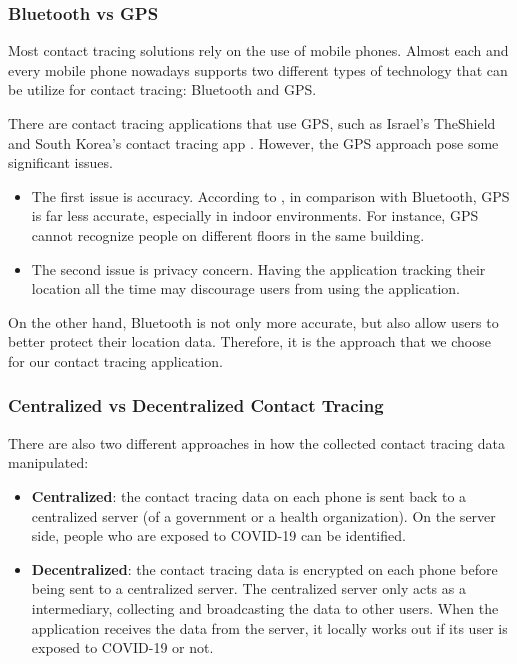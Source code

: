     \subsubsection{Bluetooth vs GPS}
      \par Most contact tracing solutions rely on the use of mobile phones. Almost each and every mobile phone nowadays supports two different types of technology that can be utilize for contact tracing: Bluetooth and GPS.
      \par There are contact tracing applications that use GPS, such as Israel's TheShield \cite{TheShield1} and South Korea's contact tracing app \cite{Korea1}. However, the GPS approach pose some significant issues.
      \begin{itemize}
        \item The first issue is accuracy. According to \cite{BlueTrace1}, in comparison with Bluetooth, GPS is far less accurate, especially in indoor environments. For instance, GPS cannot recognize people on different floors in the same building.
        \item The second issue is privacy concern. Having the application tracking their location all the time may discourage users from using the application.
      \end{itemize}
      \par On the other hand, Bluetooth is not only more accurate, but also allow users to better protect their location data. Therefore, it is the approach that we choose for our contact tracing application.
  
    \subsubsection{Centralized vs Decentralized Contact Tracing}
      \par There are also two different approaches in how the collected contact tracing data manipulated:
        \begin{itemize}
          \item \textbf{Centralized}: the contact tracing data on each phone is sent back to a centralized server (of a government or a health organization). On the server side, people who are exposed to COVID-19 can be identified.
          \item \textbf{Decentralized}: the contact tracing data is encrypted on each phone before being sent to a centralized server. The centralized server only acts as a intermediary, collecting and broadcasting the data to other users. When the application receives the data from the server, it locally works out if its user is exposed to COVID-19 or not.
        \end{itemize}
    
